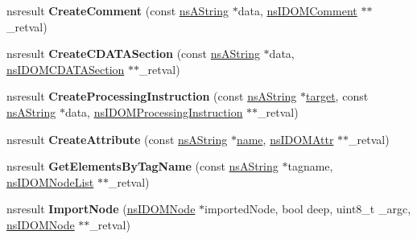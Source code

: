 \begin{DoxyCompactItemize}
nsresult {\bfseries Create\+Comment} (const \hyperlink{structns_string_container}{ns\+A\+String} $\ast$data, \hyperlink{interfacens_i_d_o_m_comment}{ns\+I\+D\+O\+M\+Comment} $\ast$$\ast$\+\_\+retval)
\item 
\mbox{\label{interfacens_i_d_o_m_document_a9750378441b948ed896d7c455fd30950}} 
nsresult {\bfseries Create\+C\+D\+A\+T\+A\+Section} (const \hyperlink{structns_string_container}{ns\+A\+String} $\ast$data, \hyperlink{interfacens_i_supports}{ns\+I\+D\+O\+M\+C\+D\+A\+T\+A\+Section} $\ast$$\ast$\+\_\+retval)
\item 
\mbox{\label{interfacens_i_d_o_m_document_a116fd384f5c90299640e0b9b9a9ef607}} 
nsresult {\bfseries Create\+Processing\+Instruction} (const \hyperlink{structns_string_container}{ns\+A\+String} $\ast$\hyperlink{interfacevoid}{target}, const \hyperlink{structns_string_container}{ns\+A\+String} $\ast$data, \hyperlink{interfacens_i_supports}{ns\+I\+D\+O\+M\+Processing\+Instruction} $\ast$$\ast$\+\_\+retval)
\item 
\mbox{\label{interfacens_i_d_o_m_document_afa3f381e1ec072fd4be16b8593c9e891}} 
nsresult {\bfseries Create\+Attribute} (const \hyperlink{structns_string_container}{ns\+A\+String} $\ast$\hyperlink{structname}{name}, \hyperlink{interfacens_i_d_o_m_attr}{ns\+I\+D\+O\+M\+Attr} $\ast$$\ast$\+\_\+retval)
\item 
\mbox{\label{interfacens_i_d_o_m_document_a351872cf2996290964da4d5a03f74cb7}} 
nsresult {\bfseries Get\+Elements\+By\+Tag\+Name} (const \hyperlink{structns_string_container}{ns\+A\+String} $\ast$tagname, \hyperlink{interfacens_i_d_o_m_node_list}{ns\+I\+D\+O\+M\+Node\+List} $\ast$$\ast$\+\_\+retval)
\item 
\mbox{\label{interfacens_i_d_o_m_document_abbead240ec648127933029fa1cfa25bd}} 
nsresult {\bfseries Import\+Node} (\hyperlink{interfacens_i_d_o_m_node}{ns\+I\+D\+O\+M\+Node} $\ast$imported\+Node, bool deep, uint8\+\_\+t \+\_\+argc, \hyperlink{interfacens_i_d_o_m_node}{ns\+I\+D\+O\+M\+Node} $\ast$$\ast$\+\_\+retval)
\item 
\mbox{\label{interfacens_i_d_o_m_document_a5bddf0d9fbfe6724f333b965af85e9c4}} 

\end{DoxyCompactItemize}
